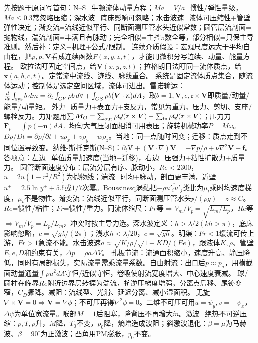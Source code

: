 先按题干原词写首句：N--S=牛顿流体动量方程；$Ma=V/a$=惯性/弹性量级，$Ma\le0.3$常忽略压缩；深水波=底床影响可忽略；水击波速=液体可压缩性+管壁弹性决定；渐变流=流线近似平行、同断面测压管水头近似常数；圆管层流剖面=抛物线，湍流剖面=丰满且有脉动；完全相似=主控$\pi$数全等，部分相似=只保主导准则。然后补：定义+机理+公式/限制。
连续介质假设：宏观尺度远大于平均自由程，把$\rho,p,\bm V$看成连续函数$F(x,y,z,t)$，才能用微积分写连续、动量、能量方程。
欧拉法盯固定空间点，给$\bm V(x,y,z,t)$；拉格朗日法盯同一流体质点，给$\bm x(a,b,c,t)$。定常流中流线、迹线、脉线重合。
系统是固定流体质点集合，随流体运动；控制体是选定空间区域，流体可进出。雷诺输运：$\frac d{dt}\int_{\rm sys}b\,dm=\partial_t\int_{CV}\rho b\,d\forall+\int_{CS}\rho b(\bm V\cdot\bm n)dA$，取$b=1,\bm V,e,\bm r\times\bm V$即质量/动量/能量/动量矩。
外力=质量力+表面力+支反力，常见为重力、压力、剪切、支座/螺栓反力。力矩题用$\sum \bm M_O=\sum_{\rm out}\rho Q(\bm r\times\bm V)-\sum_{\rm in}\rho Q(\bm r\times\bm V)$；压力力$\bm F_p=\int p(-\bm n)dA$，均匀大气压闭面相消可用表压；旋转机械功率$P=M\omega$。
$D\rho/Dt=\partial\rho/\partial t+u\rho_x+v\rho_y+w\rho_z$。当地：同一点随时间变；迁移：质点走到不同位置导致变。纳维-斯托克斯(N--S)：$\partial_t\bm V+(\bm V\cdot\nabla)\bm V=-\nabla p/\rho+\nu\nabla^2\bm V+\bm f$。答项意：左边=单位质量加速度(当地+迁移)，右边=压强力+粘性扩散力+质量力。
圆管断面速度分布：层流分层有序、脉动小，$Re<2300$，$u=2\bar u(1-r^2/R^2)$为抛物线；湍流=时均+脉动，剖面更丰满，近壁$u^+=2.5\ln y^++5.5$或$1/7$次幂。Boussinesq涡黏把$-\rho\overline{u'_iu'_j}$类比为$\mu_t$乘时均速度梯度，$\mu_t$不是物性。渐变流：流线近似平行，同断面测压管水头$p/(\rho g)+z\approx C$。
$Re$=惯性/粘性；$Fr$=惯性/重力。同流体缩尺：$Fr$等$\Rightarrow V_m/V_p=\sqrt{L_m/L_p}$，$Re$等$\Rightarrow V_m/V_p=L_p/L_m$，冲突时按主导力选。深水波定义：$h>\lambda/2(kh>\pi)$，底床影响忽略，$c=\sqrt{g\lambda/(2\pi)}$；浅水$h<\lambda/20$，$c=\sqrt{gh}$。明渠：$Fr<1$缓流可传上游，$Fr>1$急流不能。水击波速$a\approx\sqrt{K/\rho}/\sqrt{1+KD/(Ee)}$，跟液体$K,\rho$、管壁$E,e,D$和约束有关，$\Delta p=\rho a\Delta V$。
孔板节流：流通面积缩小，速度升高、静压降低，同时有局部损失，实际流量需乘流量系数。自由射流：出口后$p\approx p_a$，用横截面动量通量$\int\rho u^2dA$守恒/近似守恒，卷吸使射流宽度增大、中心速度衰减。
球/圆柱在临界$Re$附近边界层转捩为湍流，抗逆压梯度增强，分离点后移、尾迹变窄，$C_D$骤降。减阻：流线型、光滑、延迟分离、减小湿面积。
无旋$\nabla\times\bm V=0\Rightarrow\bm V=\nabla\phi$；不可压再得$\nabla^2\phi=0$。二维不可压可用$u=\psi_y,v=-\psi_x$，$\Delta\psi$为单位宽流量。喉部$M=1$后阻塞，降背压不再增大$\dot m$。激波=绝热不可逆压缩：$p,T,\rho$升，$M$降，$T_0$不变，$p_0$降，熵增造成波阻；斜激波退化：$\beta=\mu$为马赫波、$\beta=90^\circ$为正激波；凸角用PM膨胀，$p_0$不变。

